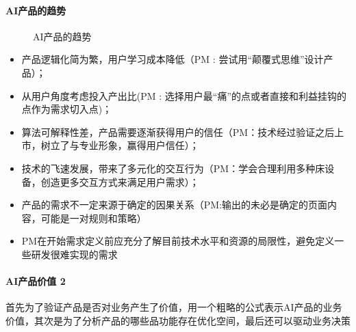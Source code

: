\documentclass[letterpaper,11pt,english]{sphinxmanual}
\begin{document}
\paragraph{AI产品的趋势}
\label{\detokenize{chapter_introduction/AI_Product:id7}}
\begin{figure}[H]
\centering
\capstart

\noindent{}
\caption{AI产品的趋势\sphinxfootnotemark[207]}\label{\detokenize{chapter_introduction/AI_Product:id19}}\end{figure}
%
\begin{footnotetext}[207]\sphinxAtStartFootnote
{}
%
\end{footnotetext}\ignorespaces \begin{itemize}
\item {} 
产品逻辑化简为繁，用户学习成本降低（PM :
尝试用“颠覆式思维”设计产品）；

\item {} 
从用户角度考虑投入产出比(PM :
选择用户最“痛”的点或者直接和利益挂钩的点作为需求切入点)；

\item {} 
算法可解释性差，产品需要逐渐获得用户的信任（PM：技术经过验证之后上市，树立了与专业形象，赢得用户信任）；

\item {} 
技术的飞速发展，带来了多元化的交互行为（PM：学会合理利用多种床设备，创造更多交互方式来满足用户需求）；

\item {} 
产品的需求不一定来源于确定的因果关系（PM:输出的未必是确定的页面内容，可能是一对规则和策略）

\item {} 
PM在开始需求定义前应充分了解目前技术水平和资源的局限性，避免定义一些研发很难实现的需求

\end{itemize}


\paragraph{AI产品价值 2\sphinxfootnotemark[208]}
\label{\detokenize{chapter_introduction/AI_Product:ai-2}}%
\begin{footnotetext}[208]\sphinxAtStartFootnote
{}
%
\end{footnotetext}\ignorespaces 
首先为了验证产品是否对业务产生了价值，用一个粗略的公式表示AI产品的业务价值，其次是为了分析产品的哪些品功能存在优化空间，最后还可以驱动业务决策
\end{document}
